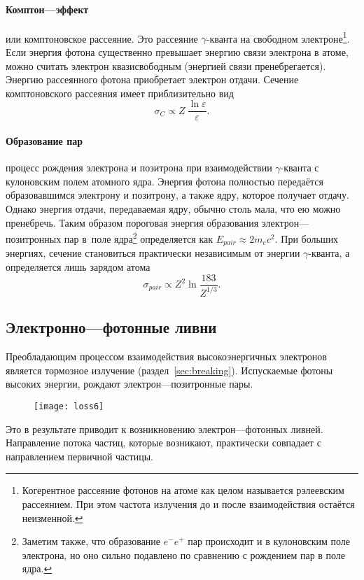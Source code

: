 \paragraph{Комптон---эффект} или комптоновское рассеяние. Это рассеяние
$\gamma$-кванта на свободном электроне\footnote{Когерентное рассеяние
  фотонов на атоме как целом называется рэлеевским рассеянием. При этом
  частота излучения до и после взаимодействия остаётся неизменной.}.
Если энергия фотона существенно превышает энергию связи электрона
в атоме, можно считать электрон квазисвободным (энергией связи
пренебрегается). Энергию рассеянного фотона приобретает электрон отдачи.
Сечение комптоновского рассеяния имеет приблизительно вид
\[
\sigma_{C}\propto Z~\frac{\ln\varepsilon}{\varepsilon}.
\]
\paragraph{Образование пар} процесс рождения электрона и
позитрона при взаимодействии $\gamma$-кванта с кулоновским полем
атомного ядра. Энергия фотона полностью передаётся образовавшимся
электрону и позитрону, а также ядру, которое получает отдачу. Однако
энергия отдачи, передаваемая ядру, обычно столь мала, что ею можно
пренебречь. Таким образом пороговая энергия образования
электрон---позитронных пар в~поле ядра\footnote{Заметим также, что
  образование $e^- e^+$ пар происходит и в кулоновским поле электрона, но
  оно сильно подавлено по сравнению с рождением пар в поле ядра.}
определяется как $E_{pair}\approx2m_ec^2$. При больших энергиях, сечение
становиться практически независимым от энергии $\gamma$-кванта, а
определяется лишь зарядом атома
\[
\sigma_{pair}\propto Z^2\ln\frac{183}{Z^{1/3}}.
\]

\subsection{Электронно---фотонные ливни}
\label{sec:showers}
Преобладающим процессом взаимодействия высокоэнергичных электронов
является тормозное излучение (раздел~\ref{sec:breaking}).
Испускаемые фотоны высоких энергии, рождают электрон---позитронные
пары.
\begin{figure}[h]\center
  \texttt{[image: loss6]}
\end{figure}
Это в результате приводит к возникновению электрон---фотонных
ливней. Направление потока частиц, которые возникают, практически
совпадает с направлением первичной частицы.

